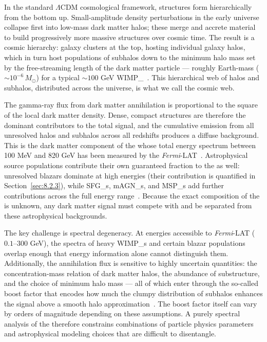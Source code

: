 In the standard $\Lambda$CDM cosmological framework, structures form hierarchically from the bottom up.
Small-amplitude density perturbations in the early universe collapse first into low-mass dark matter halos; these merge and accrete material to build progressively more massive structures over cosmic time.
The result is a cosmic hierarchy: galaxy clusters at the top, hosting individual galaxy halos, which in turn host populations of subhalos down to the minimum halo mass set by the free-streaming length of the dark matter particle --- roughly Earth-mass ($\sim 10^{-6} \, M_\odot$) for a typical $\sim100$ GeV \gls{WIMP_}~\cite{DGRB-review}.
This hierarchical web of halos and subhalos, distributed across the universe, is what we call the cosmic web.

The gamma-ray flux from dark matter annihilation is proportional to the square of the local dark matter density.
Dense, compact structures are therefore the dominant contributors to the total signal, and the cumulative emission from all unresolved halos and subhalos across all redshifts produces a diffuse background.
This is the dark matter component of the \UGRB whose total energy spectrum between 100 MeV and 820 GeV has been measured by the \textit{Fermi}-LAT~\cite{Fermi-LAT:2014ryh}. Astrophysical source populations contribute their own guaranteed fraction to the \UGRB as well: unresolved blazars dominate at high energies (their contribution is quantified in Section~\ref{sec:8.2.3}), while \glspl{SFG_}, \glspl{mAGN_}, and \glspl{MSP_} add further contributions across the full energy range~\cite{DGRB-review}.
Because the exact composition of the \UGRB is unknown, any dark matter signal must compete with and be separated from these astrophysical backgrounds.

The key challenge is spectral degeneracy.
At energies accessible to \textit{Fermi}-LAT ($0.1$--$300$ GeV), the spectra of heavy \glspl{WIMP_} and certain blazar populations overlap enough that energy information alone cannot distinguish them.
Additionally, the annihilation flux is sensitive to highly uncertain quantities: the concentration-mass relation of dark matter halos, the abundance of substructure, and the choice of minimum halo mass --- all of which enter through the so-called boost factor that encodes how much the clumpy distribution of subhalos enhances the signal above a smooth halo approximation~\cite{DGRB-review}.
The boost factor itself can vary by orders of magnitude depending on these assumptions.
A purely spectral analysis of the \UGRB therefore constrains combinations of particle physics parameters and astrophysical modeling choices that are difficult to disentangle.

